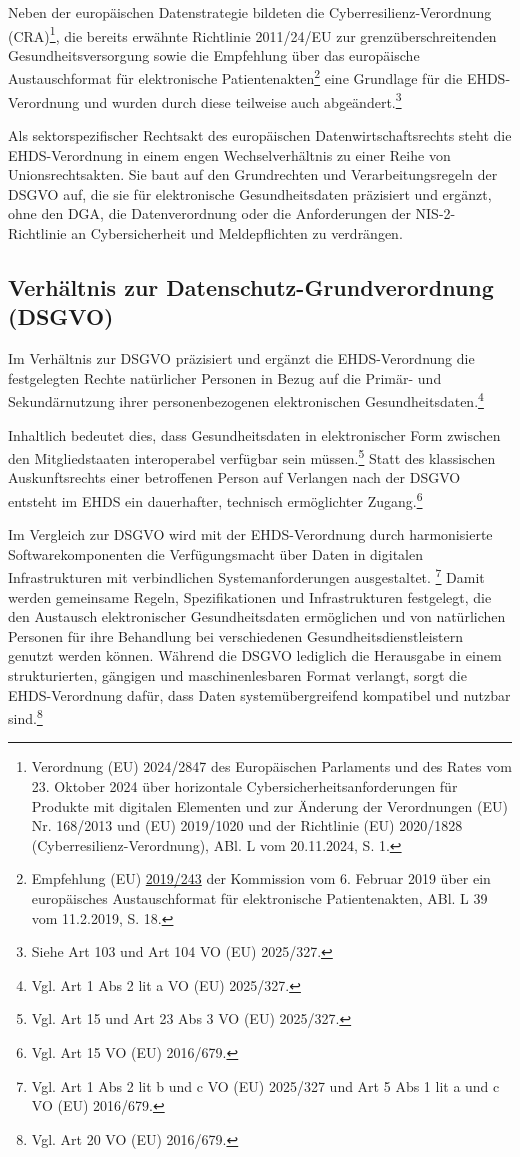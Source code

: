 Neben der europäischen Datenstrategie bildeten die Cyberresilienz-Verordnung (CRA)\footnote{Verordnung (EU) 2024/2847 des Europäischen Parlaments und des Rates vom 23. Oktober 2024 über horizontale Cybersicherheitsanforderungen für Produkte mit digitalen Elementen und zur Änderung der Verordnungen (EU) Nr. 168/2013 und (EU) 2019/1020 und der Richtlinie (EU) 2020/1828 (Cyberresilienz-Verordnung), ABl. L vom 20.11.2024, S. 1.}, die bereits erwähnte Richtlinie 2011/24/EU zur grenzüberschreitenden Gesundheitsversorgung sowie die Empfehlung über das europäische Austauschformat für elektronische Patientenakten\footnote{ Empfehlung (EU) \href{https://eur-lex.europa.eu/eli/reco/2019/243/oj/deu}{2019/243} der Kommission vom 6. Februar 2019 über ein europäisches Austauschformat für elektronische Patientenakten, ABl. L 39 vom 11.2.2019, S. 18.} eine Grundlage für die EHDS-Verordnung und wurden durch diese teilweise auch abgeändert.\footnote{Siehe Art 103 und Art 104 VO (EU) 2025/327.}


Als sektorspezifischer Rechtsakt des europäischen Datenwirtschaftsrechts steht die EHDS-Verordnung in einem engen Wechselverhältnis zu einer Reihe von Unionsrechtsakten. Sie baut auf den Grundrechten und Verarbeitungsregeln der DSGVO auf, die sie für elektronische Gesundheitsdaten präzisiert und ergänzt, ohne den DGA, die Datenverordnung oder die Anforderungen der NIS-2-Richtlinie an Cybersicherheit und Meldepflichten zu verdrängen.

        \subsection{Verhältnis zur Datenschutz-Grundverordnung (DSGVO)}
Im Verhältnis zur DSGVO präzisiert und ergänzt die EHDS-Verordnung die festgelegten Rechte natürlicher Personen in Bezug auf die Primär- und Sekundärnutzung ihrer personenbezogenen elektronischen Gesundheitsdaten.\footnote{Vgl. Art 1 Abs 2 lit a VO (EU) 2025/327.}

Inhaltlich bedeutet dies, dass Gesundheitsdaten in elektronischer Form zwischen den Mitgliedstaaten interoperabel verfügbar sein müssen.\footnote{Vgl. Art 15 und Art 23 Abs 3 VO (EU) 2025/327.} Statt des klassischen Auskunftsrechts einer betroffenen Person auf Verlangen nach der DSGVO entsteht im EHDS ein dauerhafter, technisch ermöglichter Zugang.\footnote{Vgl. Art 15 VO (EU) 2016/679.}

Im Vergleich zur DSGVO wird mit der EHDS-Verordnung durch harmonisierte Softwarekomponenten die Verfügungsmacht über Daten in digitalen Infrastrukturen mit verbindlichen Systemanforderungen ausgestaltet. \footnote{Vgl. Art 1 Abs 2 lit b und c VO (EU) 2025/327 und Art 5 Abs 1 lit a und c VO (EU) 2016/679.} Damit werden gemeinsame Regeln, Spezifikationen und Infrastrukturen festgelegt, die den Austausch elektronischer Gesundheitsdaten ermöglichen und von natürlichen Personen für ihre Behandlung bei verschiedenen Gesundheitsdienstleistern genutzt werden können. Während die DSGVO lediglich die Herausgabe in einem strukturierten, gängigen und maschinenlesbaren Format verlangt, sorgt die EHDS-Verordnung dafür, dass Daten systemübergreifend kompatibel und nutzbar sind.\footnote{Vgl. Art 20 VO (EU) 2016/679.}

